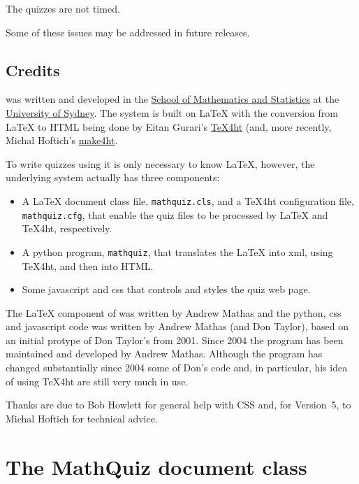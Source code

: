 \documentclass[svgnames]{article}
\begin{document}
    The quizzes are not timed.

    Some of these issues may be addressed in future releases.

\subsection{Credits}
    \MathQuiz{} was written and developed in the
    \href{http://www.maths.usyd.edu.au/}{School of Mathematics and
    Statistics} at the \href{http://www.usyd.edu.au/}{University of
    Sydney}.  The system is built on \LaTeX{} with the conversion from
    \LaTeX{} to HTML being done by Eitan Gurari's
    \href{http://www.cis.ohio-state.edu/~gurari/TeX4ht/mn.html}{TeX4ht}
    (and, more recently, Michal Hoftich's
    \href{https://github.com/michal-h21/make4ht}{make4ht}.

    To write quizzes using \MathQuiz it is only necessary to know
    \LaTeX, however, the underlying \MathQuiz system actually has three components:
    \begin{itemize}
      \item A \LaTeX{} document class file, \texttt{mathquiz.cls}, and
      a \TeX 4ht configuration file, \texttt{mathquiz.cfg}, that enable the
      quiz files to be processed by \LaTeX{} and \TeX 4ht, respectively.
      \item A python program, \texttt{mathquiz}, that translates the
      \LaTeX{} into xml, using \TeX 4ht, and then into HTML.
      \item Some javascript and css that controls and styles the quiz web page.
    \end{itemize}

   The \LaTeX{} component of \MathQuiz{} was written by Andrew Mathas
   and the python, css and javascript code was written by Andrew Mathas
   (and Don Taylor), based on an initial protype of Don Taylor's from
   2001.  Since 2004 the program has been maintained and developed by
   Andrew Mathas. Although the program has changed substantially since
   2004 some of Don's code and, in particular, his idea of using
   \TeX 4ht are still very much in use.

   Thanks are due to Bob Howlett for general help with CSS and, for
   Version~5, to  Michal Hoftich for technical advice.

\section{The MathQuiz document class}\label{S:documentclass}
\end{document}
